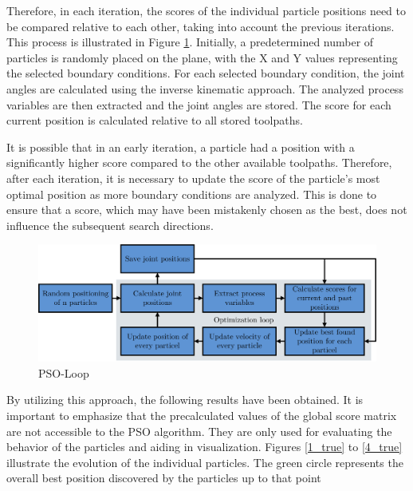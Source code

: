 Therefore, in each iteration, the scores of the individual particle positions need to be compared relative to each other, taking into account the previous iterations. This process is illustrated in Figure \ref{swarmloop}. Initially, a predetermined number of particles is randomly placed on the plane, with the X and Y values representing the selected boundary conditions. For each selected boundary condition, the joint angles are calculated using the inverse kinematic approach. The analyzed process variables are then extracted and the joint angles are stored. The score for each current position is calculated relative to all stored toolpaths.

It is possible that in an early iteration, a particle had a position with a significantly higher score compared to the other available toolpaths. Therefore, after each iteration, it is necessary to update the score of the particle's most optimal position as more boundary conditions are analyzed. This is done to ensure that a score, which may have been mistakenly chosen as the best, does not influence the subsequent search directions.

\begin{figure}[H]
	\centerline{\includegraphics[width=1\textwidth]{figures/swarmloop.png}}
	\caption{PSO-Loop}
	\label{swarmloop}
\end{figure}

By utilizing this approach, the following results have been obtained. It is important to emphasize that the precalculated values of the global score matrix are not accessible to the \acrshort{PSO} algorithm. They are only used for evaluating the behavior of the particles and aiding in visualization. Figures \ref{1_true} to \ref{4_true} illustrate the evolution of the individual particles. The green circle represents the overall best position discovered by the particles up to that point
\newpage

